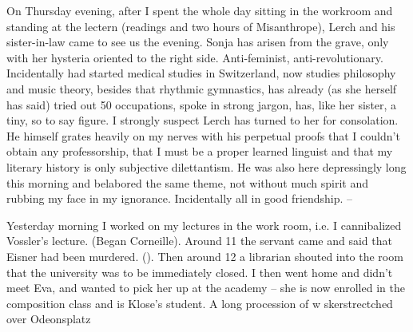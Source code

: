 
On Thursday evening, after I spent the whole day sitting in the workroom and standing at the lectern (readings and two hours of Misanthrope), Lerch and his sister-in-law came to see us the evening. Sonja has arisen from the grave, only with her hysteria oriented to the right side. Anti-feminist, anti-revolutionary. Incidentally had started medical studies in Switzerland, now studies philosophy and music theory, besides that rhythmic gymnastics, has already (as she herself has said) tried out 50 occupations, spoke in strong jargon, has, like her sister, a tiny, so to say  figure. I strongly suspect Lerch has turned to her for consolation. He himself grates heavily on my nerves with his perpetual proofs that I couldn't obtain any professorship, that I must be a proper learned linguist and that my literary history is only subjective dilettantism. He was also here depressingly long this morning and belabored the same theme, not without much spirit and rubbing my face in my ignorance. Incidentally all in good friendship. --

Yesterday morning I worked on my lectures in the work room, i.e. I cannibalized Vossler's lecture. (Began Corneille). Around 11 the servant came and said that Eisner had been murdered. (). Then around 12 a librarian shouted into the room that the university was to be immediately closed. I then went home and didn't meet Eva, and wanted to pick her up at the academy -- she is now enrolled in the composition class and is Klose's student. A long procession of w skerstrectched over Odeonsplatz

